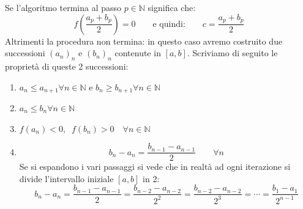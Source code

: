 {\begin{enumerate}
  \end{enumerate}

  Se l'algoritmo termina al passo $p \in \mathbb{N}$ significa che:
  \begin{equation*}
    f\left(\dfrac{a_p + b_p}{2}\right) = 0 \qquad \text{e quindi:} \qquad c = 
    \dfrac{a_p + b_p}{2}
  \end{equation*}
  Altrimenti la procedura non termina: in questo caso avremo costruito due 
  successioni $(a_n)_n$ e $(b_n)_n$ contenute in $[a, b]$. Scriviamo di 
  seguito le proprietà di queste 2 successioni:
  \begin{enumerate}[label=\roman*.]
    \item $a_n \leq a_{n+1} \forall n \in \mathbb{N}$ \quad e \quad $b_n 
      \geq b_{n+1} \forall n \in \mathbb{N}$

    \item $a_n \leq b_n \forall n \in \mathbb{N}$ 
      
    \item $f(a_n) < 0, \;\; f(b_n) > 0 \quad \forall n \in \mathbb{N}$
    
    \item 
      \begin{equation*}
        b_n - a_n = \dfrac{b_{n-1} - a_{n-1}}{2} \qquad \forall n
      \end{equation*}
      Se si espandono i vari passaggi si vede che in realtà ad ogni iterazione 
      si divide l'intervallo iniziale $[a, b]$ in 2:
      \begin{equation*}
        b_n - a_n = \dfrac{b_{n-1} - a_{n-1}}{2} = \dfrac{b_{n-2} - 
        a_{n-2}}{2^2} = \dfrac{b_{n-2} - a_{n-2}}{2^3}  = \cdots = \dfrac{b_1 - 
        a_1}{2^{n-1}}
      \end{equation*}
  \end{enumerate}

}
